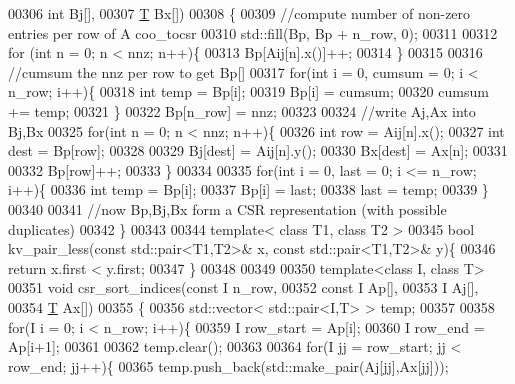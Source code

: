 \begin{DoxyCode}
00306                      \textcolor{keywordtype}{int} Bj[],
00307                      \hyperlink{group___sparse_core___module}{T} Bx[])
00308 \{
00309     \textcolor{comment}{//compute number of non-zero entries per row of A coo\_tocsr}
00310     std::fill(Bp, Bp + n\_row, 0);
00311 
00312     \textcolor{keywordflow}{for} (\textcolor{keywordtype}{int} n = 0; n < nnz; n++)\{
00313         Bp[Aij[n].x()]++;
00314     \}
00315 
00316     \textcolor{comment}{//cumsum the nnz per row to get Bp[]}
00317     \textcolor{keywordflow}{for}(\textcolor{keywordtype}{int} i = 0, cumsum = 0; i < n\_row; i++)\{
00318         \textcolor{keywordtype}{int} temp = Bp[i];
00319         Bp[i] = cumsum;
00320         cumsum += temp;
00321     \}
00322     Bp[n\_row] = nnz;
00323 
00324     \textcolor{comment}{//write Aj,Ax into Bj,Bx}
00325     \textcolor{keywordflow}{for}(\textcolor{keywordtype}{int} n = 0; n < nnz; n++)\{
00326         \textcolor{keywordtype}{int} row  = Aij[n].x();
00327         \textcolor{keywordtype}{int} dest = Bp[row];
00328 
00329         Bj[dest] = Aij[n].y();
00330         Bx[dest] = Ax[n];
00331 
00332         Bp[row]++;
00333     \}
00334 
00335     \textcolor{keywordflow}{for}(\textcolor{keywordtype}{int} i = 0, last = 0; i <= n\_row; i++)\{
00336         \textcolor{keywordtype}{int} temp = Bp[i];
00337         Bp[i]  = last;
00338         last   = temp;
00339     \}
00340 
00341     \textcolor{comment}{//now Bp,Bj,Bx form a CSR representation (with possible duplicates)}
00342 \}
00343 
00344 \textcolor{keyword}{template}< \textcolor{keyword}{class} T1, \textcolor{keyword}{class} T2 >
00345 \textcolor{keywordtype}{bool} kv\_pair\_less(\textcolor{keyword}{const} std::pair<T1,T2>& x, \textcolor{keyword}{const} std::pair<T1,T2>& y)\{
00346     \textcolor{keywordflow}{return} x.first < y.first;
00347 \}
00348 
00349 
00350 \textcolor{keyword}{template}<\textcolor{keyword}{class} I, \textcolor{keyword}{class} T>
00351 \textcolor{keywordtype}{void} csr\_sort\_indices(\textcolor{keyword}{const} I n\_row,
00352                       \textcolor{keyword}{const} I Ap[],
00353                             I Aj[],
00354                             \hyperlink{group___sparse_core___module}{T} Ax[])
00355 \{
00356     std::vector< std::pair<I,T> > temp;
00357 
00358     \textcolor{keywordflow}{for}(I i = 0; i < n\_row; i++)\{
00359         I row\_start = Ap[i];
00360         I row\_end   = Ap[i+1];
00361 
00362         temp.clear();
00363 
00364         \textcolor{keywordflow}{for}(I jj = row\_start; jj < row\_end; jj++)\{
00365             temp.push\_back(std::make\_pair(Aj[jj],Ax[jj]));

\end{DoxyCode}
